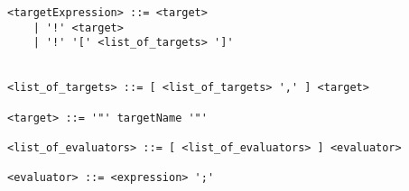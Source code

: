 \begin{small}
\begin{verbatim}
<targetExpression> ::= <target> 
    | '!' <target>
    | '!' '[' <list_of_targets> ']' 


<list_of_targets> ::= [ <list_of_targets> ',' ] <target> 
        
<target> ::= '"' targetName '"'

<list_of_evaluators> ::= [ <list_of_evaluators> ] <evaluator>

<evaluator> ::= <expression> ';'
\end{verbatim}
\end{small}